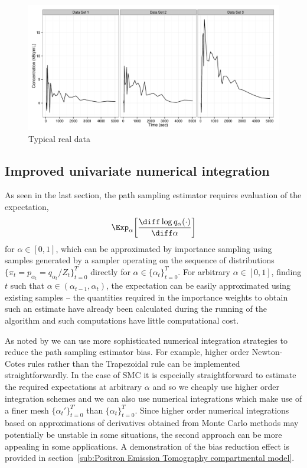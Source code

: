 \begin{figure}[t]
  \includegraphics[width=\linewidth]{fig/Typical_PET}
  \caption{Typical real \pet data}
  \label{fig:typical real pet}
\end{figure}

\subsection{Improved univariate numerical integration}
\label{sub:Improved univariate numerical integration}

As seen in the last section, the path sampling estimator requires evaluation
of the expectation,
\begin{equation*}
  \Exp_\alpha \biggl[ \rnd{\log q_{\alpha}(\cdot)}{\alpha} \biggr]
\end{equation*}
for $\alpha\in[0,1]$, which can be approximated by importance sampling using
samples generated by a \smc sampler operating on the sequence of distributions
$\{\pi_t = p_{\alpha_t} = q_{\alpha_t}/Z_t\}_{t=0}^T$ directly for
$\alpha\in\{\alpha_t\}_{t=0}^T$. For arbitrary $\alpha\in[0,1]$, finding $t$
such that $\alpha\in(\alpha_{t-1},\alpha_t)$, the expectation can be easily
approximated using existing \smc samples -- the quantities required in the
importance weights to obtain such an estimate have already been calculated
during the running of the \smc algorithm and such computations have little
computational cost. %

As noted by \cite{Friel:2012}  we can use more sophisticated numerical
integration strategies to reduce the path sampling estimator bias. For
example, higher order Newton-Cotes rules rather than the Trapezoidal rule can
be implemented straightforwardly. In the case of SMC it is especially
straightforward to estimate the required expectations at arbitrary $\alpha$
and so we cheaply use higher order integration schemes and we can also use
numerical integrations which make use of a finer mesh
$\{\alpha_t'\}_{t=0}^{T'}$ than $\{\alpha_t\}_{t=0}^T$. Since higher order
numerical integrations based on approximations of derivatives obtained from
Monte Carlo methods may potentially be unstable in some situations, the second
approach can be more appealing in some applications. A demonstration of the
bias reduction effect is provided in section~\ref{sub:Positron Emission
  Tomography compartmental model}.

